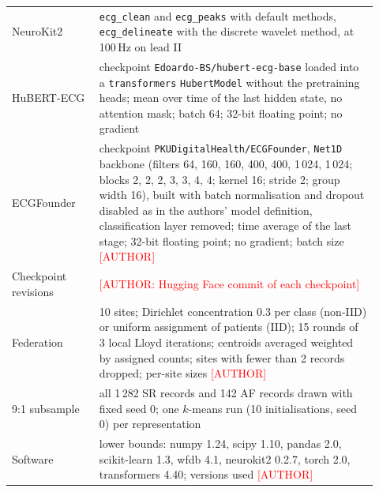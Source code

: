 \documentclass[preprint,11pt]{elsarticle}
\begin{document}
\begin{table}[ht]
\begin{tabular}{p{0.22\linewidth}p{0.70\linewidth}}
NeuroKit2 & \texttt{ecg\_clean} and \texttt{ecg\_peaks} with default methods,
\texttt{ecg\_delineate} with the discrete wavelet method, at 100\,Hz on lead II \\
HuBERT-ECG & checkpoint \texttt{Edoardo-BS/hubert-ecg-base} loaded into a
\texttt{transformers} \texttt{HubertModel} without the pretraining heads; mean over time
of the last hidden state, no attention mask; batch 64; 32-bit floating point; no gradient \\
ECGFounder & checkpoint \texttt{PKUDigitalHealth/ECGFounder}, \texttt{Net1D} backbone
(filters 64, 160, 160, 400, 400, 1\,024, 1\,024; blocks 2, 2, 2, 3, 3, 4, 4; kernel 16;
stride 2; group width 16), built with batch normalisation and dropout disabled as in the
authors' model definition, classification layer removed; time average of the last stage; 32-bit floating point; no
gradient; batch size \textcolor{red}{[AUTHOR]} \\
Checkpoint revisions & \textcolor{red}{[AUTHOR: Hugging Face commit of each checkpoint]} \\
Federation & 10 sites; Dirichlet concentration 0.3 per class (non-IID) or uniform
assignment of patients (IID); 15 rounds of 3 local Lloyd iterations; centroids averaged
weighted by assigned counts; sites with fewer than 2 records dropped; per-site sizes
\textcolor{red}{[AUTHOR]} \\
9:1 subsample & all 1\,282 SR records and 142 AF records drawn with fixed seed 0; one
$k$-means run (10 initialisations, seed 0) per representation \\
Software & lower bounds: numpy 1.24, scipy 1.10, pandas 2.0, scikit-learn 1.3, wfdb 4.1,
neurokit2 0.2.7, torch 2.0, transformers 4.40; versions used
\textcolor{red}{[AUTHOR]} \\
\bottomrule
\end{tabular}
\end{table}
\end{document}
